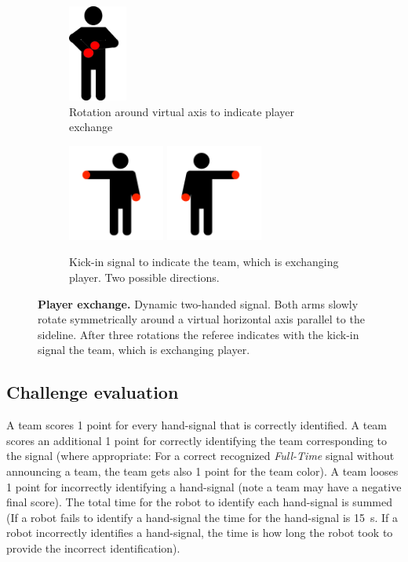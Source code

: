 \begin{figure}[ht!]
    \centering
    \begin{subfigure}{.33\textwidth}
        \centering
        \includegraphics[height=120px]{figs/technical_challenges/player_exchange.png}
        \caption{Rotation around virtual axis to indicate player exchange}
    \end{subfigure}
    \begin{subfigure}{.6\textwidth}
        \centering
        \includegraphics[height=120px]{figs/technical_challenges/kick-in.png}
        \includegraphics[height=120px]{figs/technical_challenges/kick-in-flipped.png}
        \caption{Kick-in signal to indicate the team, which is exchanging player. Two possible directions.}
    \end{subfigure}
    \caption{\textbf{Player exchange.} Dynamic two-handed signal. Both arms slowly rotate symmetrically around a virtual horizontal axis parallel to the sideline. After three rotations the referee indicates with the kick-in signal the team, which is exchanging player.}
\end{figure}

\subsection{Challenge evaluation}

A team scores 1 point for every hand-signal that is correctly identified. A team scores an additional 1 point for correctly identifying the team corresponding to the signal (where appropriate: For a correct recognized \textit{Full-Time} signal without announcing a team, the team gets also 1 point for the team color). A team looses 1 point for incorrectly identifying a hand-signal (note a team may have a negative final score). The total time for the robot to identify each hand-signal is summed (If a robot fails to identify a hand-signal the time for the hand-signal is \qty{15}{\second}. If a robot incorrectly identifies a hand-signal, the time is how long the robot took to provide the incorrect identification).

